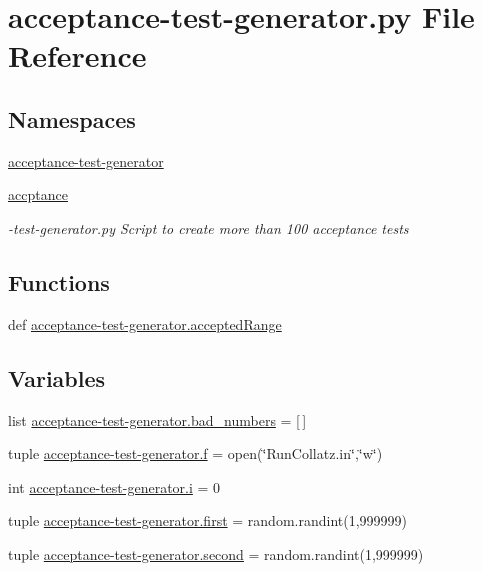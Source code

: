 \hypertarget{acceptance-test-generator_8py}{\section{acceptance-\/test-\/generator.py File Reference}
\label{acceptance-test-generator_8py}
}
\subsection*{Namespaces}
\begin{DoxyCompactItemize}
\item 
\hyperlink{namespaceacceptance-test-generator}{acceptance-\/test-\/generator}
\item 
\hyperlink{namespaceaccptance}{accptance}
\begin{DoxyCompactList}\small\item\em -\/test-\/generator.\-py Script to create more than 100 acceptance tests \end{DoxyCompactList}\end{DoxyCompactItemize}
\subsection*{Functions}
\begin{DoxyCompactItemize}
\item 
def \hyperlink{namespaceacceptance-test-generator_a691fddb60a46bd7ee1eec69d67717e1d}{acceptance-\/test-\/generator.\-accepted\-Range}
\end{DoxyCompactItemize}
\subsection*{Variables}
\begin{DoxyCompactItemize}
\item 
list \hyperlink{namespaceacceptance-test-generator_ad53ff9f7d71782d1865d93280abeb8a6}{acceptance-\/test-\/generator.\-bad\-\_\-numbers} = \mbox{[}$\,$\mbox{]}
\item 
tuple \hyperlink{namespaceacceptance-test-generator_ab6bd3d00ba498096feb3cfec3107dbbf}{acceptance-\/test-\/generator.\-f} = open(\char`\"{}Run\-Collatz.\-in\char`\"{},\char`\"{}w\char`\"{})
\item 
int \hyperlink{namespaceacceptance-test-generator_a1d577d018a80b654fc60ead446833608}{acceptance-\/test-\/generator.\-i} = 0
\item 
tuple \hyperlink{namespaceacceptance-test-generator_ad138dc10eef77c4fd3af95e6074cce15}{acceptance-\/test-\/generator.\-first} = random.\-randint(1,999999)
\item 
tuple \hyperlink{namespaceacceptance-test-generator_a1b19b963dafdf85225cef301ebeabde7}{acceptance-\/test-\/generator.\-second} = random.\-randint(1,999999)
\end{DoxyCompactItemize}
